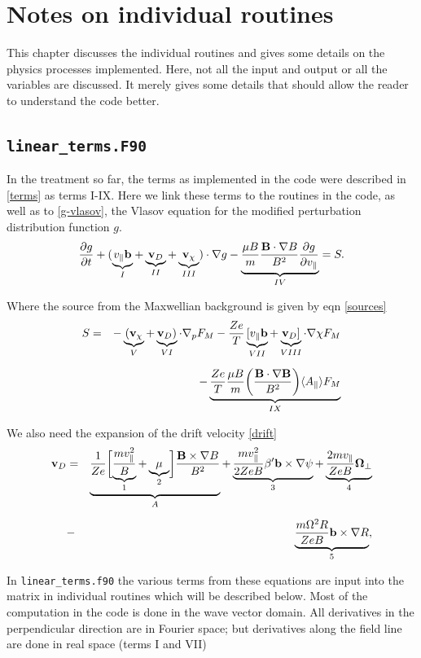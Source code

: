 \documentclass{report}
\def\be{\begin{equation}}
\def\ee{\end{equation}}
\def\bee{\begin{eqnarray}}
\def\eee{\end{eqnarray}}
\begin{document}
\chapter{Notes on individual routines} 

This chapter discusses the individual routines and gives some details on the physics 
processes implemented. Here, not all the input and output or all the variables are 
discussed. It merely gives some details that should allow the reader to understand
the code better. 

\section{\texttt{linear\_terms.F90}}%
In the treatment so far, the terms as implemented in the code were described in \ref{terms} as terms I-IX. Here we link these terms to the routines in the code, as well as to \ref{g-vlasov}, the Vlasov equation for the modified perturbation distribution function $g$.
\be 
\label{1}
{\partial g \over \partial t} + (\underbrace{v_\parallel {\bf b}}_{I} + \underbrace{{\bf v}_D}_{II} + \underbrace{{\bf v}_\chi}_{III}) \cdot \nabla g  
-\underbrace{{\mu B \over m}{{\bf B}\cdot \nabla B \over B^2}{\partial g \over \partial v_\parallel}}_{IV} = S. 
\ee

Where the source from the Maxwellian background is given by eqn \ref{sources}
\bee 
\label{2}
S &=&  - \underbrace{({\bf v}_\chi}_{V} + \underbrace{{\bf v}_D)}_{VI} \cdot \nabla_p F_M
-  {Ze \over T} \underbrace{[ v_\parallel {\bf b}}_{VII} + \underbrace{{\bf v}_D ]}_{VIII} \cdot \nabla \chi F_M \cr 
\noalign{\vskip 0.2 truecm} 
& & - \underbrace{{Z e \over T} {\mu B \over m} \biggl ( {{\bf B} \cdot \nabla {\bf B} \over B^2} 
\biggr ) \langle A_\parallel \rangle F_M }_{IX}
\eee

We also need the expansion of the drift velocity \ref{drift}
\bee
\label{3}
{\bf v}_D &=& \underbrace{{1\over Ze} \biggl [ \underbrace{{m v_\parallel^2\over B}}_{1} + \underbrace{\mu}_{2} \biggr ] {{\bf B} \times \nabla B
\over B^2}}_{A} + \underbrace{{m v_\parallel^2 \over 2 Z e B} \beta^\prime {\bf b} \times \nabla \psi}_{3} 
 + \underbrace{{ 2 m v_\parallel \over Z e B } {\bf \Omega}_\perp}_{4} \cr 
\noalign{\vskip 0.2 truecm} 
&-& \underbrace{{m \Omega^2 R \over Z e B }  {\bf b} \times {\nabla R}}_{5}, 
\eee

In \texttt {linear\_terms.f90} the various terms from these equations are input into the matrix in individual routines which will be described below.  Most of the computation in the code is done in the wave vector domain. All derivatives in the perpendicular direction are in Fourier space; but derivatives along the field line are done in real space (terms I and VII)
\end{document}
